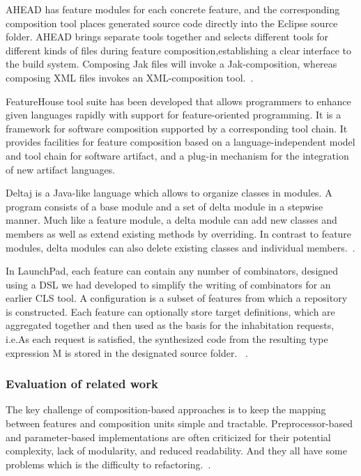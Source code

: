 AHEAD has feature modules for each concrete feature, and the corresponding composition tool places generated
source code directly into the Eclipse source folder. AHEAD brings separate tools together and selects different
tools for different kinds of files during feature composition,establishing a clear interface to the build
system. Composing Jak files will invoke a Jak-composition, whereas composing XML files invokes an
XML-composition tool.~\cite{Batory2004FeatureorientedPA}.

FeatureHouse tool suite has been developed that allows programmers to enhance given languages rapidly with
support for feature-oriented programming. It is a framework for software composition supported by a
corresponding tool chain. It provides facilities for feature  composition based on a language-independent
model and tool chain for software artifact, and a plug-in mechanism for the integration of new artifact
languages.~\cite{Apel:2009:FLA:1555001.1555038}

Deltaj is a Java-like language which allows to organize classes in modules. A program consists of a base
 module and a set of delta module in a stepwise manner. Much like a feature module, a delta module can add
 new classes and members as well as extend existing methods by overriding. In contrast to feature modules,
 delta modules can also delete existing classes and individual members.~\cite{Schaefer:2010:DPS:1885639.1885647}.

In LaunchPad, each feature can contain any number of combinators, designed using a DSL we had developed to
simplify the writing of combinators for an earlier CLS tool. A configuration is a subset of features from
which a repository is constructed. Each feature can optionally store target definitions, which are aggregated
 together and then used as the basis for the inhabitation requests, i.e.As each request is satisfied, the
 synthesized code from the resulting type expression M is stored in the designated source folder.
~\cite{Heineman:2015:TMO:2791060.2791076}.

\subsubsection{Evaluation of related work}

The key challenge of composition-based approaches is to keep the mapping between features and composition units
simple and tractable. Preprocessor-based and parameter-based implementations are often criticized for their
potential complexity, lack of modularity, and reduced readability. And they all have some problems which is the
difficulty to refactoring.~\cite{Kim:2017:RJS:3106195.3106201}.

